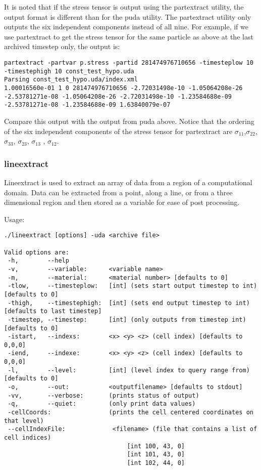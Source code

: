 It is noted that if the stress tensor is output using the partextract utility, the output format is different than for the puda utility.  The partextract utility only outputs the six independent components instead of all nine.  For example, if we use partextract to get the stress tensor for the same particle as above at the last archived timestep only, the output is:

\begin{verbatim}
partextract -partvar p.stress -partid 281474976710656 -timesteplow 10 -timestephigh 10 const_test_hypo.uda
Parsing const_test_hypo.uda/index.xml
1.00016560e-01 1 0 281474976710656 -2.72031498e-10 -1.05064208e-26 -2.53781271e-08 -1.05064208e-26 -2.72031498e-10 -1.23584688e-09 -2.53781271e-08 -1.23584688e-09 1.63840079e-07

\end{verbatim}

Compare this output with the output from puda above.  Notice that the ordering of the six independent components of the stress tensor for partextract are $\sigma_{11}$,$\sigma_{22}$, $\sigma_{33}$, $\sigma_{23}$, $\sigma_{13}$ , $\sigma_{12}$.



\subsubsection{lineextract}

Lineextract is used to extract an array of data from a region of a computational domain. Data can be extracted from a point, along a line, or from a three dimensional region and then stored as a variable for ease of post processing.

Usage: \begin{Verbatim}[fontsize=\footnotesize]
./lineextract [options] -uda <archive file>

Valid options are:
 -h,        --help
 -v,        --variable:      <variable name>
 -m,        --material:      <material number> [defaults to 0]
 -tlow,     --timesteplow:   [int] (sets start output timestep to int) [defaults to 0]
 -thigh,    --timestephigh:  [int] (sets end output timestep to int) [defaults to last timestep]
 -timestep, --timestep:      [int] (only outputs from timestep int) [defaults to 0]
 -istart,   --indexs:        <x> <y> <z> (cell index) [defaults to 0,0,0]
 -iend,     --indexe:        <x> <y> <z> (cell index) [defaults to 0,0,0]
 -l,        --level:         [int] (level index to query range from) [defaults to 0]
 -o,        --out:           <outputfilename> [defaults to stdout]
 -vv,       --verbose:       (prints status of output)
 -q,        --quiet:         (only print data values)
 -cellCoords:                (prints the cell centered coordinates on that level)
 --cellIndexFile:             <filename> (file that contains a list of cell indices)
                                  [int 100, 43, 0]
                                  [int 101, 43, 0]
                                  [int 102, 44, 0]
\end{Verbatim}


